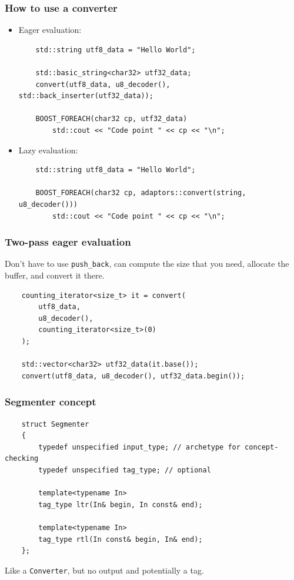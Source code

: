 \documentclass{beamer}
\begin{document}
\begin{frame}[fragile]
	\frametitle{How to use a converter}
	
	\begin{itemize}
	\item Eager evaluation:
	\begin{lstlisting}
	std::string utf8_data = "Hello World";
	
	std::basic_string<char32> utf32_data;
	convert(utf8_data, u8_decoder(), std::back_inserter(utf32_data));
	
	BOOST_FOREACH(char32 cp, utf32_data)
	    std::cout << "Code point " << cp << "\n";
	\end{lstlisting}
	
	\item Lazy evaluation:
	\begin{lstlisting}
	std::string utf8_data = "Hello World";
	
	BOOST_FOREACH(char32 cp, adaptors::convert(string, u8_decoder()))
	    std::cout << "Code point " << cp << "\n";
	\end{lstlisting}
	\end{itemize}
	
\end{frame}

\begin{frame}[fragile]
	\frametitle{Two-pass eager evaluation}
	
	Don't have to use \lstinline{push_back}, can compute the size that you need,
	allocate the buffer, and convert it there.
	\bigskip
	
	\begin{lstlisting}
	counting_iterator<size_t> it = convert(
	    utf8_data,
	    u8_decoder(),
	    counting_iterator<size_t>(0)
	);
	
	std::vector<char32> utf32_data(it.base());
	convert(utf8_data, u8_decoder(), utf32_data.begin());
	\end{lstlisting}
	
\end{frame}

\begin{frame}[fragile]
	\frametitle{Segmenter concept}
	
	\begin{lstlisting}
	struct Segmenter
	{
	    typedef unspecified input_type; // archetype for concept-checking
	    typedef unspecified tag_type; // optional
	
	    template<typename In>
	    tag_type ltr(In& begin, In const& end);
	
	    template<typename In>
	    tag_type rtl(In const& begin, In& end);		
	};
	\end{lstlisting}
	
	Like a \lstinline{Converter}, but no output and potentially a tag.
\end{frame}
\end{document}
